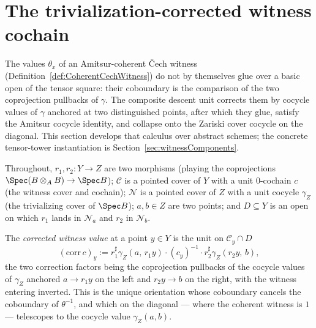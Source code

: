 \section{The trivialization-corrected witness cochain}
\label{sec:witnessCorrection}

The values \(\theta_x\) of an Amitsur-coherent \v Cech witness
(Definition~\ref{def:CoherentCechWitness}) do not by themselves glue over a basic open of the
tensor square: their coboundary is the comparison of the two coprojection pullbacks of
\(\gamma\). The composite descent unit corrects them by cocycle values of \(\gamma\) anchored
at two distinguished points, after which they glue, satisfy the Amitsur cocycle identity, and
collapse onto the Zariski cover cocycle on the diagonal. This section develops that calculus
over abstract schemes; the concrete tensor-tower instantiation is
Section~\ref{sec:witnessComponents}.

Throughout, \(r_1, r_2 \colon Y \to Z\) are two morphisms (playing the coprojections
\(\Spec(B \otimes_A B) \to \Spec B\)); \(\mathcal C\) is a pointed cover of \(Y\) with a unit
\(0\)-cochain \(c\) (the witness cover and cochain); \(\mathcal N\) is a pointed cover of
\(Z\) with a unit cocycle \(\gamma_Z\) (the trivializing cover of \(\Spec B\)); \(a, b \in Z\)
are two points; and \(D \subseteq Y\) is an open on which \(r_1\) lands in \(\mathcal N_a\) and
\(r_2\) in \(\mathcal N_b\).

\begin{definition}
  \label{def:unitsCorrCochain}
  \leanok
  The \emph{corrected witness value} at a point \(y \in Y\) is the unit on
  \(\mathcal C_y \cap D\)
  \[
    (\mathrm{corr}\,c)_y := r_1^{\sharp}\gamma_Z(a,\, r_1 y) \cdot (c_y)^{-1} \cdot
      r_2^{\sharp}\gamma_Z(r_2 y,\, b) ,
  \]
  the two correction factors being the coprojection pullbacks of the cocycle values of
  \(\gamma_Z\) anchored \(a \to r_1 y\) on the left and \(r_2 y \to b\) on the right, with the
  witness entering inverted. This is the unique orientation whose coboundary cancels the
  coboundary of \(\theta^{-1}\), and which on the diagonal — where the coherent witness is
  \(1\) — telescopes to the cocycle value \(\gamma_Z(a, b)\).
\end{definition}

